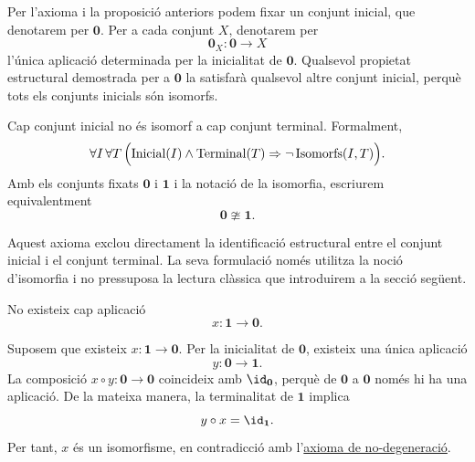 \begin{notacio}\label{not:inicial-escollit}
Per l'axioma i la proposició anteriors podem fixar un conjunt inicial, que denotarem per \(\mathbf0\). Per a cada conjunt \(X\), denotarem per
\[
\mathbf{0}_X:\mathbf0\to X
\]
l'única aplicació determinada per la inicialitat de \(\mathbf0\). Qualsevol propietat estructural demostrada per a \(\mathbf0\)
la satisfarà qualsevol altre conjunt inicial, perquè tots
els conjunts inicials són isomorfs.
\end{notacio}

\begin{axioma}[No-degeneració]\label{ax:no-degeneracio}
Cap conjunt inicial no és isomorf a cap conjunt terminal. Formalment,
\[
\forall I\,\forall T\,\Bigl(\operatorname{Inicial}(I)\land\operatorname{Terminal}(T)\Rightarrow\neg\operatorname{Isomorfs}(I,T)\Bigr).
\]
Amb els conjunts fixats \(\mathbf0\) i \(\mathbf1\) i la notació de la isomorfia, escriurem equivalentment
\[
\mathbf0\ncong\mathbf1.
\]
\end{axioma}

Aquest axioma exclou directament la identificació estructural
entre el conjunt inicial i el conjunt terminal. La seva formulació
només utilitza la noció d'isomorfia i no pressuposa la lectura
clàssica que introduirem a la secció següent.

\begin{proposicio}\label{prop:no-fletxa-u-zero}
No existeix cap aplicació
\[
x:\mathbf1\to\mathbf0.
\]
\end{proposicio}

\begin{prova}
Suposem que existeix \(x:\mathbf1\to\mathbf0\). Per la inicialitat de \(\mathbf0\), existeix una única aplicació
\[
y:\mathbf0\to\mathbf1.
\]
La composició \(x\circ y:\mathbf0\to\mathbf0\) coincideix amb \(\id_{\mathbf0}\), perquè de \(\mathbf0\) a \(\mathbf0\) només hi ha una aplicació. De la mateixa manera, la terminalitat de \(\mathbf1\) implica
\[
y\circ x=\id_{\mathbf1}.
\]
Per tant, \(x\) és un isomorfisme, en contradicció amb l'\hyperref[ax:no-degeneracio]{axioma de no-degeneració}.
\end{prova}

